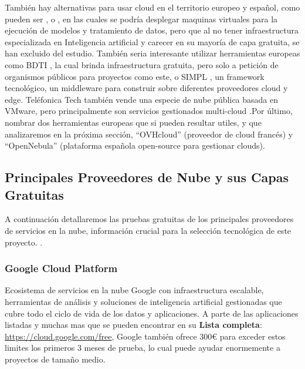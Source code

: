 También hay alternativas para usar cloud en el territorio europeo y español, como pueden ser \citep{cloudingIO}, \citep{nextcloudCloud} o \citep{gigasCloud}, en las cuales se podría desplegar maquinas virtuales para la ejecución de modelos y tratamiento de datos, pero que al no tener infraestructura especializada en Inteligencia artificial y carecer en su mayoría de capa gratuita, se han excluido del estudio. También seria interesante utilizar herramientas europeas como BDTI \citep{BDTIEuropeProject}, \citep{GobEspana2021BDTI} la cual brinda infraestructura gratuita, pero solo a petición de organismos públicos para proyectos como este, o SIMPL \citep{SIMPLEuropeProject}, un framework tecnológico, un middleware para construir sobre diferentes proveedores cloud y edge. Teléfonica Tech también vende una especie de nube pública basada en VMware, pero principalmente son servicios gestionados multi-cloud \citep{TelefonicaTechCloudPlatform}.Por último, nombrar dos herramientas europeas que si pueden resultar utiles, y que analizaremos en la próxima sección, ``OVHcloud'' (proveedor de cloud francés) y ``OpenNebula'' (plataforma española open-source para gestionar clouds).

\subsection{Principales Proveedores de Nube y sus Capas Gratuitas}
\label{sec:cloud-free-tiers}

A continuación detallaremos las pruebas gratuitas de los principales proveedores de servicios en la nube, información crucial para la selección tecnológica de este proyecto. \citep{free-for-dev}.

\subsubsection*{Google Cloud Platform}

Ecosistema de servicios en la nube Google con infraestructura escalable, herramientas de análisis y soluciones de inteligencia artificial gestionadas que cubre todo el ciclo de vida de los datos y aplicaciones. A parte de las aplicaciones listadas y muchas mas que se pueden encontrar en su \textbf{Lista completa}: \url{https://cloud.google.com/free}, Google también ofrece 300€ para exceder estos limites los primeros 3 meses de prueba, lo cual puede ayudar enormemente a proyectos de tamaño medio.

